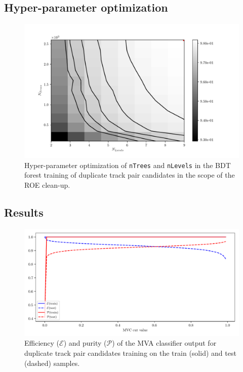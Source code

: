 \subsection*{Hyper-parameter optimization}

\begin{figure}[H]
\centering
\captionsetup{width=0.8\linewidth}
\includegraphics[width=\linewidth]{fig/addendums/dup_hpo}
\caption{Hyper-parameter optimization of \texttt{nTrees} and \texttt{nLevels} in the BDT forest training of duplicate track pair candidates in the scope of the ROE clean-up.}
\end{figure}

\subsection*{Results}

\begin{figure}[H]
\centering
\captionsetup{width=0.8\linewidth}
\includegraphics[width=\linewidth]{fig/addendums/dup_effpur}
\caption{Efficiency ($\mathcal{E}$) and purity ($\mathcal{P}$) of the MVA classifier output for duplicate track pair candidates training on the train (solid) and test (dashed) samples.}
\end{figure}

